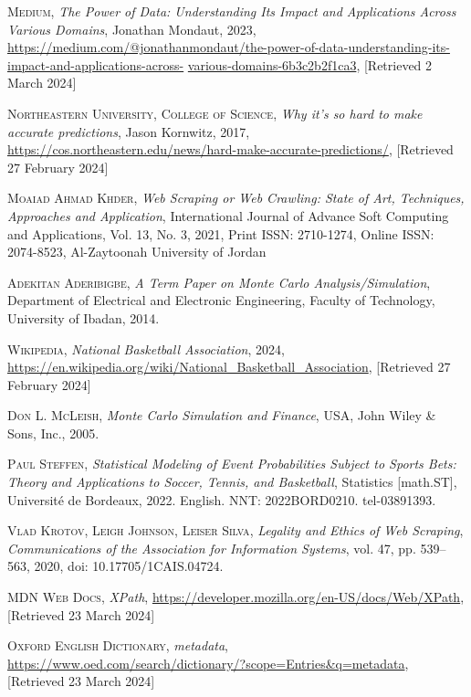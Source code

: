 \documentclass{thesis-ekf}
\theoremstyle{definition}
\theoremstyle{remark}
\begin{document}
\begin{thebibliography}{2}

\textsc{Medium}, 
\emph {The Power of Data: Understanding Its Impact and Applications Across Various Domains}, Jonathan Mondaut, 2023, \url{https://medium.com/@jonathanmondaut/the-power-of-data-understanding-its-impact-and-applications-across-}
\url{various-domains-6b3c2b2f1ca3}, [Retrieved 2 March 2024]

\textsc{Northeastern University, College of Science},
\emph{Why it’s so hard to make accurate predictions}, Jason Kornwitz, 2017, \url{https://cos.northeastern.edu/news/hard-make-accurate-predictions/}, [Retrieved 27 February 2024]

\textsc{Moaiad Ahmad Khder},
\emph{Web Scraping or Web Crawling: State of Art, Techniques, Approaches and Application}, 
International Journal of Advance Soft Computing and Applications, 
Vol. 13, No. 3, 2021, 
Print ISSN: 2710-1274, Online ISSN: 2074-8523, 
Al-Zaytoonah University of Jordan

\textsc{Adekitan Aderibigbe},
\emph{A Term Paper on Monte Carlo Analysis/Simulation},
Department of Electrical and Electronic Engineering,
Faculty of Technology, University of Ibadan,
2014.

\textsc{Wikipedia},
\emph{National Basketball Association}, 2024, 
\url{https://en.wikipedia.org/wiki/National_Basketball_Association}, [Retrieved 27 February 2024]

\textsc{Don L. McLeish}, 
\emph{Monte Carlo Simulation and Finance}, 
USA, John Wiley \& Sons, Inc., 2005.

\textsc{Paul Steffen},
\emph{Statistical Modeling of Event Probabilities Subject to Sports Bets: Theory and Applications to Soccer, Tennis, and Basketball},
Statistics [math.ST], Université de Bordeaux, 2022.
English.
NNT: 2022BORD0210.
tel-03891393.

\textsc{Vlad Krotov, Leigh Johnson, Leiser Silva},
\emph{Legality and Ethics of Web Scraping},
\textit{Communications of the Association for Information Systems},
vol. 47,
pp. 539--563,
2020,
doi: 10.17705/1CAIS.04724.

\textsc{MDN Web Docs},
\emph{XPath}, 
\url{https://developer.mozilla.org/en-US/docs/Web/XPath}, [Retrieved 23 March 2024]

\textsc{Oxford English Dictionary},
\emph{metadata},
\url{https://www.oed.com/search/dictionary/?scope=Entries&q=metadata}, [Retrieved 23 March 2024]


\end{thebibliography}
\end{document}

